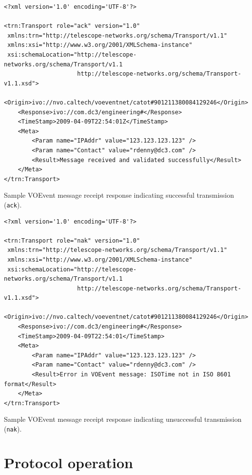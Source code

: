 \documentclass[a4paper,11pt]{ivoa}
\begin{document}
\begin{listing*}
\begin{verbatim}
<?xml version='1.0' encoding='UTF-8'?>

<trn:Transport role="ack" version="1.0"
 xmlns:trn="http://telescope-networks.org/schema/Transport/v1.1"
 xmlns:xsi="http://www.w3.org/2001/XMLSchema-instance"
 xsi:schemaLocation="http://telescope-networks.org/schema/Transport/v1.1
                     http://telescope-networks.org/schema/Transport-v1.1.xsd">
    <Origin>ivo://nvo.caltech/voeventnet/catot#901211380084129246</Origin>
    <Response>ivo://com.dc3/engineering#</Response>
    <TimeStamp>2009-04-09T22:54:01Z</TimeStamp>
    <Meta>
        <Param name="IPAddr" value="123.123.123.123" />
        <Param name="Contact" value="rdenny@dc3.com" />
        <Result>Message received and validated successfully</Result>
    </Meta>
</trn:Transport>
\end{verbatim}
\caption{Sample VOEvent message receipt response indicating successful
transmission (\texttt{ack}).}
\label{lst:ack}
\end{listing*}

\begin{listing*}
\begin{verbatim}
<?xml version='1.0' encoding='UTF-8'?>

<trn:Transport role="nak" version="1.0"
 xmlns:trn="http://telescope-networks.org/schema/Transport/v1.1"
 xmlns:xsi="http://www.w3.org/2001/XMLSchema-instance"
 xsi:schemaLocation="http://telescope-networks.org/schema/Transport/v1.1
                     http://telescope-networks.org/schema/Transport-v1.1.xsd">
    <Origin>ivo://nvo.caltech/voeventnet/catot#901211380084129246</Origin>
    <Response>ivo://com.dc3/engineering#</Response>
    <TimeStamp>2009-04-09T22:54:01</TimeStamp>
    <Meta>
        <Param name="IPAddr" value="123.123.123.123" />
        <Param name="Contact" value="rdenny@dc3.com" />
        <Result>Error in VOEvent message: ISOTime not in ISO 8601 format</Result>
    </Meta>
</trn:Transport>
\end{verbatim}
\caption{Sample VOEvent message receipt response indicating unsuccessful
transmission (\texttt{nak}).}
\label{lst:nak}
\end{listing*}

\section{Protocol operation}
\end{document}
